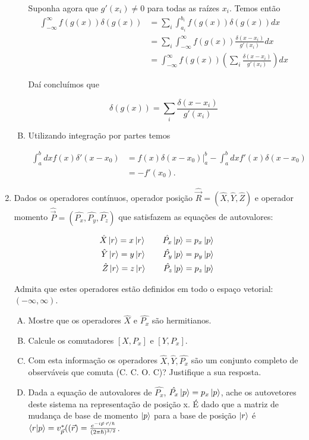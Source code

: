 \documentclass[a4paper, 12pt, notitlepage]{article}
\begin{document}
\begin{enumerate}
\begin{enumerate}[(A)]
  Suponha agora que $g'(x_i) \neq 0$ para todas as raízes $x_i$. Temos então
  \begin{align*}
  \int_{-\infty}^{\infty} f(g(x)) \delta(g(x)) &= \sum_i \int_{a_i}^{b_i} f(g(x)) \delta(g(x))dx \\
  &= \sum_i \int_{-\infty}^{\infty} f(g(x)) \frac{\delta(x-x_i)}{g'(x_i)}dx \\
  &= \int_{-\infty}^{\infty} f(g(x)) \left(\sum_i \frac{\delta(x-x_i)}{g'(x_i)}\right) dx
  \end{align*}
  
  Daí concluímos que
  
  \begin{equation*}
    \delta(g(x)) = \sum_i \frac{\delta(x-x_i)}{g'(x_i)}
  \end{equation*}
  
  \item Utilizando integração por partes temos
  
  \begin{align*}
  \int_a^b dx f(x) \delta'(x-x_0) &= f(x)\delta(x-x_0)\Big|_a^b - \int_a^b dx f'(x) \delta(x - x_0) \\
  &= -f'(x_0).
  \end{align*}

\end{enumerate}

\item Dados os operadores contínuos, operador posição $\hat{\vec{R}} = (\hat{X}, \hat{Y}, \hat{Z})$ e operador momento $\hat{\vec{P}} = (\hat{P_x}, \hat{P_y}, \hat{P_z})$ que satisfazem as equações de autovalores:

\begin{align*}
  \hat{X}\ket{r} = x \ket{r} \qquad \hat{P_x}\ket{p} = p_x \ket{p} \\
  \hat{Y}\ket{r} = y \ket{r} \qquad \hat{P_y}\ket{p} = p_y \ket{p} \\
  \hat{Z}\ket{r} = z \ket{r} \qquad \hat{P_z}\ket{p} = p_z \ket{p} \\
\end{align*}

Admita que estes operadores estão definidos em todo o espaço vetorial: $(-\infty, \infty)$.

\begin{enumerate}[(A)]
  \item Mostre que os operadores $\hat{X}$ e $\hat{P_x}$ são hermitianos.
  \item Calcule os comutadores $[X, P_x]$ e $[Y, P_x]$.
  \item Com esta informação os operadores $\hat{X}, \hat{Y}, \hat{P_x}$ são um conjunto completo de observáveis que comuta (C. C. O. C)? Justifique a sua resposta.
  \item Dada a equação de autovalores de $\hat{P_x}$, $\hat{P_x}\ket{p} = p_x \ket{p}$, ache os autovetores deste sistema na representação de posição x.
  É dado que a matriz de mudança de base de momento $\ket{p}$ para a base de posição $\ket{r}$ é $\bra{r}\ket{p} = v^\ast_{\vec{p}}((\vec{r}) = \frac{e^{-i\vec{p} \cdot \vec{r}/\hslash}}{(2\pi\hslash)^{3/2}}$.
\end{enumerate}


\end{enumerate}
\end{document}
